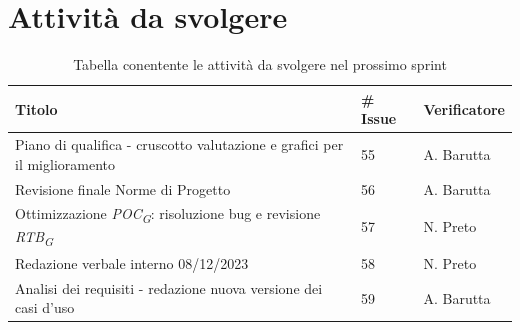 \documentclass{article}
\begin{document}
\section{Attività da svolgere}
    \begin{table}[H]
        \centering
        \begin{tabular}{|C{7cm}|C{1,5cm}|C{3cm}|}
            \hline
            \textbf{Titolo} & \textbf{\# Issue} & \textbf{Verificatore}\\
            \hline\hline           
            Piano di qualifica - cruscotto valutazione e grafici per il miglioramento  & 55 & A. Barutta\\
            \hline
            Revisione finale Norme di Progetto & 56 & A. Barutta\\
            \hline
            Ottimizzazione \textit{POC}\textsubscript{\textit{G}}: risoluzione bug e revisione \textit{RTB}\textsubscript{\textit{G}} & 57 & N. Preto\\
            \hline
            Redazione verbale interno 08/12/2023 & 58 & N. Preto\\
            \hline
            Analisi dei requisiti - redazione nuova versione dei casi d'uso & 59 & A. Barutta\\
            \hline
        \end{tabular}
        \caption{Tabella conentente le attività da svolgere nel prossimo sprint}
    \end{table}
\end{document}
